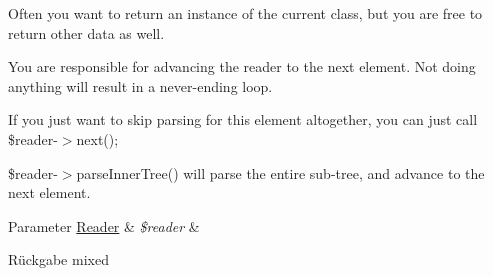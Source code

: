 Often you want to return an instance of the current class, but you are free to return other data as well.

You are responsible for advancing the reader to the next element. Not doing anything will result in a never-\/ending loop.

If you just want to skip parsing for this element altogether, you can just call \$reader-\/$>$next();

\$reader-\/$>$parse\+Inner\+Tree() will parse the entire sub-\/tree, and advance to the next element.


\begin{DoxyParams}[1]{Parameter}
\mbox{\hyperlink{class_sabre_1_1_xml_1_1_reader}{Reader}} & {\em \$reader} & \\
\hline
\end{DoxyParams}
\begin{DoxyReturn}{Rückgabe}
mixed 
\end{DoxyReturn}


